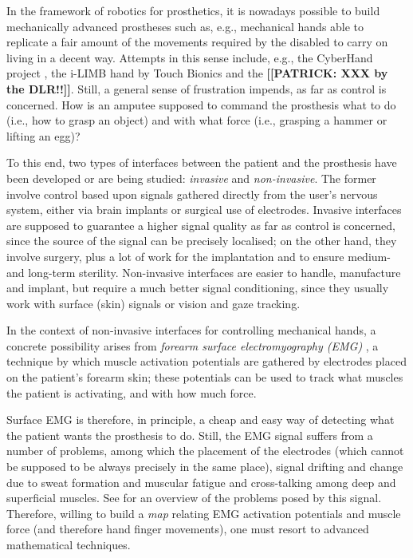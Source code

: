 In the framework of robotics for prosthetics, it is nowadays possible
to build mechanically advanced prostheses such as, e.g., mechanical
hands able to replicate a fair amount of the movements required by the
disabled to carry on living in a decent way. Attempts in this sense
include, e.g., the CyberHand project \cite{cyberhand}, the i-LIMB hand
by Touch Bionics \cite{ilimb} and the \textbf{[[PATRICK: XXX by the
DLR!!]]}. Still, a general sense of frustration impends, as far as
control is concerned. How is an amputee supposed to command the
prosthesis what to do (i.e., how to grasp an object) and with what
force (i.e., grasping a hammer or lifting an egg)?

To this end, two types of interfaces between the patient and the
prosthesis have been developed or are being studied: \emph{invasive}
and \emph{non-invasive}. The former involve control based upon signals
gathered directly from the user's nervous system, either via brain
implants or surgical use of electrodes. Invasive interfaces are
supposed to guarantee a higher signal quality as far as control is
concerned, since the source of the signal can be precisely localised;
on the other hand, they involve surgery, plus a lot of work for the
implantation and to ensure medium- and long-term
sterility. Non-invasive interfaces are easier to handle, manufacture
and implant, but require a much better signal conditioning, since they
usually work with surface (skin) signals or vision and gaze tracking.

In the context of non-invasive interfaces for controlling mechanical
hands, a concrete possibility arises from \emph{forearm surface
electromyography (EMG)} \cite{zecca}, a technique by which muscle
activation potentials are gathered by electrodes placed on the
patient's forearm skin; these potentials can be used to track what
muscles the patient is activating, and with how much force.

Surface EMG is therefore, in principle, a cheap and easy way of
detecting what the patient wants the prosthesis to do. Still, the EMG
signal suffers from a number of problems, among which the placement of
the electrodes (which cannot be supposed to be always precisely in the
same place), signal drifting and change due to sweat formation and
muscular fatigue and cross-talking among deep and superficial
muscles. See \cite{deluca} for an overview of the problems posed by
this signal. Therefore, willing to build a \emph{map} relating EMG
activation potentials and muscle force (and therefore hand finger
movements), one must resort to advanced mathematical techniques.

